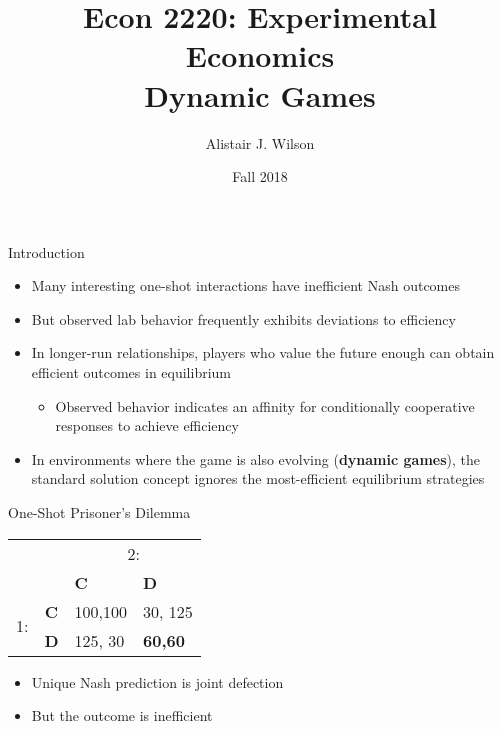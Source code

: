 \documentclass{beamer}
\title{\LARGE Econ 2220: Experimental Economics \\ Dynamic Games}
\author{Alistair J. Wilson }
\date{Fall 2018}
\begin{document}
\maketitle


\begin{frame}{Introduction}
	\begin{itemize}
		\item Many interesting one-shot interactions have inefficient Nash outcomes
		\item But observed lab behavior frequently exhibits deviations to efficiency
		\item In longer-run relationships, players who value the future enough can
		obtain efficient outcomes in equilibrium
			\begin{itemize}
				\item Observed behavior indicates an affinity for conditionally cooperative
			responses to achieve efficiency
			\end{itemize}
		\item In environments where the game is also evolving (\textbf{dynamic games}),
		the standard solution concept ignores the most-efficient equilibrium
		strategies
	\end{itemize}
\end{frame}



\begin{frame}{One-Shot Prisoner's Dilemma}
	\begin{center}
		\begin{tabular}{cc|p{}|p{}|}
		 & \multicolumn{1}{c}{} & \multicolumn{2}{c}{2:}\\
		 & \multicolumn{1}{c}{} & \multicolumn{1}{p{0.14\textwidth}}{\textbf{C}} & \multicolumn{1}{p{0.14\textwidth}}{\textbf{D}}\\
		\cline{3-4}
		\multirow{2}{*}{1:} & \textbf{C} & 100,100 & 30, 125\\
		\cline{3-4}
		 & \textbf{D} & 125, 30 & \textbf{60,60}\\
		\cline{3-4}
		\end{tabular}
	\end{center}

	\begin{itemize}
		\item Unique Nash prediction is joint defection
		\item But the outcome is inefficient
	\end{itemize}
\end{frame}
\end{document}
